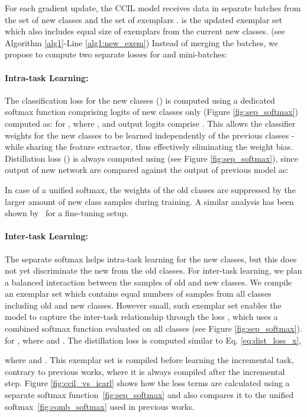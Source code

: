 \documentclass[final]{cvpr}
\newcommand{\ilkd}{CCIL }
\begin{document}
For each gradient update, the \ilkd model receives data in separate batches from the set of new classes  and the set of exemplars .  is the updated exemplar set which also includes equal size of exemplars from the current new classes. (see Algorithm \ref{alg1}-Line \ref{alg1:new_exem})
Instead of merging the batches, we propose to compute two separate losses for  and  mini-batches: 

\paragraph{Intra-task Learning:}
The classification loss for the new classes () is computed using a dedicated softmax function  comprising logits of new classes only (Figure \ref{fig:sep_softmax}) computed as: 
for , where ,  and output logits comprise .
This allows the classifier weights for the new classes to be learned independently of the previous classes - while sharing the feature extractor, thus effectively eliminating the weight bias.
Distillation loss () is always computed using  (see Figure \ref{fig:sep_softmax}), since output of new network  are compared against the output of previous model  as:

In case of a unified softmax, the weights of the old classes are suppressed by the larger amount of new class samples during training.
A similar analysis has been shown by~\cite{sep_softmax} for a fine-tuning setup. 



\paragraph{Inter-task Learning:}
The separate softmax helps intra-task learning for the new classes, but this does not yet discriminate the new from the old classes. For inter-task learning, we plan a balanced interaction between the samples of old and new classes. We compile an exemplar set  which contains equal numbers of samples from all classes including old and new classes. However small, such exemplar set enables the model to capture the inter-task relationship through the loss , which uses a combined softmax function  evaluated on all classes (see Figure \ref{fig:sep_softmax}). 
for , where  and . The distillation loss is computed similar to Eq. \ref{eq:dist_loss_x},

where  and . This exemplar set is compiled before learning the incremental task, contrary to previous works, where it is always compiled after the incremental step. Figure \ref{fig:ccil_vs_icarl} shows how the loss terms are calculated using a separate softmax function~\ref{fig:sep_softmax} and also compares it to the unified softmax~\ref{fig:comb_softmax} used in previous works. 
\end{document}
